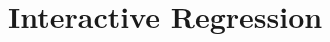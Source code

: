 \documentclass{beamer}
\begin{document}
%
%
%
%
%
%
%
%
%
%


\section{Interactive Regression}
\end{document}
